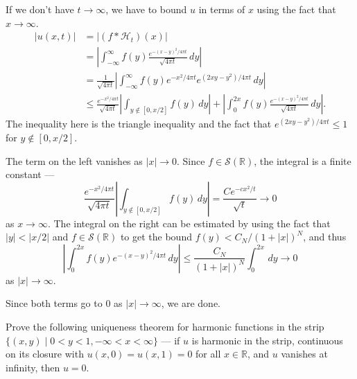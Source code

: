 \documentclass[12 pt, letterpaper]{hmcpset}
\begin{document}
\begin{solution}
	If we don't have $t \to \infty$, we have to bound $u$ in terms of $x$ using the fact that $x \to \infty$.
	\begin{align*}
		\lvert u(x, t) \rvert & = \left \lvert (f * \mathcal{H}_{t})(x) \right \rvert \\
				      & = \left \lvert \int_{-\infty}^{\infty} f(y) \frac{e^{-(x - y)^{2} / 4 \pi t}}{\sqrt{4 \pi t}} \, dy \right \rvert \\
				      & = \frac{1}{\sqrt{4 \pi t}} \left \lvert \int_{-\infty}^{\infty} f(y) e^{-x^{2} / 4 \pi t} e^{ (2xy - y^{2}) / 4 \pi t} \, dy \right \rvert  \\
				      & \le \frac{e^{-x^{2} / 4 \pi t}}{\sqrt{4 \pi t}} \left \lvert \int_{y \notin [0, x/2]} f(y) \, dy  \right \rvert + \left \lvert \int_{0}^{2x} f(y) \frac{e^{-(x - y)^{2}/4 \pi t}}{\sqrt{4 \pi t}} \, dy  \right \rvert.
	\end{align*}
	The inequality here is the triangle inequality and the fact that $e^{(2xy - y^{2})/4 \pi t} \le 1$ for $y \notin [0, x/2]$.

	The term on the left vanishes as $\lvert x \rvert \to 0$. Since $f \in \mathcal{S}(\mathbb{R})$, the integral is a finite constant ---
	\[
		\frac{e^{-x^{2} / 4 \pi t}}{\sqrt{4 \pi t}} \left \lvert \int_{y \notin [0, x/2]} f(y) \, dy  \right \rvert = \frac{C e^{- c x^{2} / t}}{\sqrt{t}} \to 0
	\]
	as $x \to \infty$. The integral on the right can be estimated by using the fact that $\lvert y \rvert < \lvert x / 2 \rvert$ and $f \in \mathcal{S}(\mathbb{R})$ to get the bound $f(y) < C_{N} / (1 + \lvert x \rvert)^{N}$, and thus
	\[
		\left \lvert \int_{0}^{2x} f(y) e^{-(x - y)^{2} / 4 \pi t} \, dy  \right \rvert \le \frac{C_{N}}{(1 + \lvert x \rvert)^{N}} \int_{0}^{2x} \, dy \to 0
	\]
	as $\lvert x \rvert \to \infty$.
	
	Since both terms go to $0$ as $\lvert x \rvert \to \infty$, we are done.
\end{solution}

\pagebreak

\begin{problem}[S \& S \S 5.5 \#13]
	Prove the following uniqueness theorem for harmonic functions in the strip $\{ (x, y) \mid 0 < y < 1, -\infty < x < \infty \}$ --- if $u$ is harmonic in the strip, continuous on its closure with $u(x, 0) = u(x, 1) = 0$ for all $x \in \mathbb{R}$, and $u$ vanishes at infinity, then $u = 0$.
\end{problem}
\end{document}
